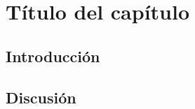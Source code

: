 \documentclass[main.tex]{subfiles}
\begin{document}
\chapter{Título del capítulo}

\section{Introducción}

\section{Discusión}

\ifSubfilesClassLoaded{
    
}{}
\end{document}
